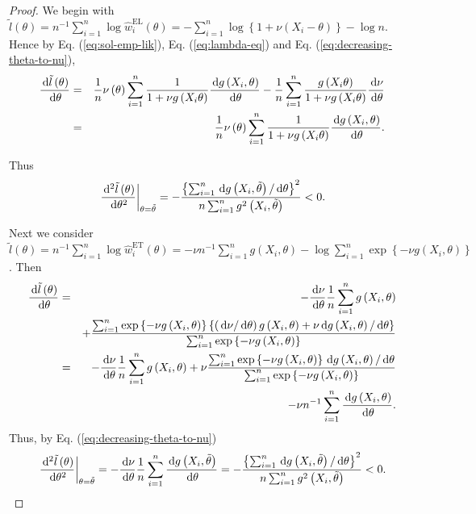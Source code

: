 \begin{proof}
We begin with $\tilde{l}\left(\theta\right)=n^{-1}\sum_{i=1}^{n}\log\hat{w}_{i}^{\mathrm{EL}}\left(\theta\right)=-\sum_{i=1}^{n}\log\left\{ 1+\nu\left(X_{i}-\theta\right)\right\} -\log n$.
Hence by Eq. (\ref{eq:sol-emp-lik}), Eq. (\ref{eq:lambda-eq}) and Eq. (\ref{eq:decreasing-theta-to-nu}),
\begin{eqnarray*}
\frac{\,\mathrm{d}\tilde{l}\left(\theta\right)}{\,\mathrm{d}\theta}&=&\frac{1}{n}\nu\left(\theta\right)\sum_{i=1}^{n}\frac{1}{1+\nu g\left(X_{i}\theta\right)}\frac{\,\mathrm{d} g\left(X_{i},\theta\right)}{\,\mathrm{d}\theta}-\frac{1}{n}\sum_{i=1}^{n}\frac{g\left(X_{i}\theta\right)}{1+\nu g\left(X_{i}\theta\right)}\frac{\,\mathrm{d}\nu}{\,\mathrm{d}\theta}\\
&=&\frac{1}{n}\nu\left(\theta\right)\sum_{i=1}^{n}\frac{1}{1+\nu g\left(X_{i}\theta\right)}\frac{\,\mathrm{d} g\left(X_{i},\theta\right)}{\,\mathrm{d}\theta}.
\end{eqnarray*}


Thus 
\[
\left.\frac{\,\mathrm{d}^{2}\tilde{l}\left(\theta\right)}{\,\mathrm{d}\theta^{2}}\right|_{\theta=\tilde{\theta}}=-\frac{\left\{ \sum_{i=1}^{n}\,\mathrm{d} g\left(X_{i},\tilde{\theta}\right)/\,\mathrm{d}\theta\right\} ^{2}}{n\sum_{i=1}^{n}g^{2}\left(X_{i},\tilde{\theta}\right)}<0.
\]


Next we consider $\tilde{l}\left(\theta\right)=n^{-1}\sum_{i=1}^{n}\log\hat{w}_{i}^{\mathrm{ET}}\left(\theta\right)=-\nu n^{-1}\sum_{i=1}^{n}g\left(X_{i},\theta\right)-\log\sum_{i=1}^{n}\exp\left\{ -\nu g\left(X_{i},\theta\right)\right\} $.
Then 
\begin{eqnarray*}
\frac{\,\mathrm{d}\tilde{l}\left(\theta\right)}{\,\mathrm{d}\theta} & = & -\frac{\,\mathrm{d}\nu}{\,\mathrm{d}\theta}\frac{1}{n}\sum_{i=1}^{n}g\left(X_{i},\theta\right)\\
 &  & +\frac{\sum_{i=1}^{n}\exp\left\{ -\nu g\left(X_{i},\theta\right)\right\} \left\{ \left(\,\mathrm{d}\nu/\,\mathrm{d}\theta\right) g\left(X_{i},\theta\right)+\nu\,\mathrm{d} g\left(X_{i},\theta\right)/\,\mathrm{d}\theta\right\} }{\sum_{i=1}^{n}\exp\left\{ -\nu g\left(X_{i},\theta\right)\right\} }\\
 & = & -\frac{\,\mathrm{d}\nu}{\,\mathrm{d}\theta}\frac{1}{n}\sum_{i=1}^{n}g\left(X_{i},\theta\right)+\nu\frac{\sum_{i=1}^{n}\exp\left\{ -\nu g\left(X_{i},\theta\right)\right\} \,\mathrm{d} g\left(X_{i},\theta\right)/\,\mathrm{d}\theta}{\sum_{i=1}^{n}\exp\left\{ -\nu g\left(X_{i},\theta\right)\right\} }\\
 &  & -\nu n^{-1}\sum_{i=1}^{n}\frac{\,\mathrm{d} g\left(X_{i},\theta\right)}{\,\mathrm{d}\theta}.
\end{eqnarray*}
Thus, by Eq. (\ref{eq:decreasing-theta-to-nu})
\[
\left.\frac{\,\mathrm{d}^{2}\tilde{l}\left(\theta\right)}{\,\mathrm{d}\theta^{2}}\right|_{\theta=\tilde{\theta}}=-\frac{\,\mathrm{d}\nu}{\,\mathrm{d}\theta}\frac{1}{n}\sum_{i=1}^{n}\frac{\,\mathrm{d} g\left(X_{i},\tilde{\theta}\right)}{\,\mathrm{d}\theta}=-\frac{\left\{ \sum_{i=1}^{n}\,\mathrm{d} g\left(X_{i},\tilde{\theta}\right)/\,\mathrm{d}\theta\right\} ^{2}}{n\sum_{i=1}^{n}g^{2}\left(X_{i},\tilde{\theta}\right)}<0.
\]



\end{proof}
